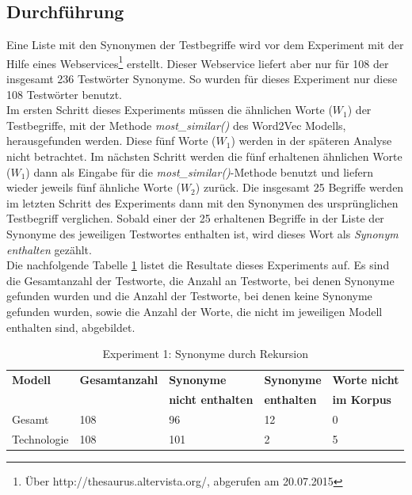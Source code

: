\documentclass[12pt,a4paper]{report}
\begin{document}
		\subsection*{Durchführung}
		Eine Liste mit den Synonymen der Testbegriffe wird vor dem Experiment mit der Hilfe eines Webservices\footnote{Über http://thesaurus.altervista.org/, abgerufen am 20.07.2015} erstellt. Dieser Webservice liefert aber nur für 108 der insgesamt 236 Testwörter Synonyme. So wurden für dieses Experiment nur diese 108 Testwörter benutzt.\\
		Im ersten Schritt dieses Experiments müssen die ähnlichen Worte ($W_1$) der Testbegriffe, mit der Methode \textit{most\_similar()} des Word2Vec Modells, herausgefunden werden. Diese fünf Worte ($W_1$) werden in der späteren Analyse nicht betrachtet. Im nächsten Schritt werden die fünf erhaltenen ähnlichen Worte ($W_1$) dann als Eingabe für die \textit{most\_similar()}-Methode benutzt und liefern wieder jeweils fünf ähnliche Worte ($W_2$) zurück. Die insgesamt 25 Begriffe werden im letzten Schritt des Experiments dann mit den Synonymen des ursprünglichen Testbegriff verglichen. Sobald einer der 25 erhaltenen Begriffe in der Liste der Synonyme des jeweiligen Testwortes enthalten ist, wird dieses Wort als \textit{Synonym enthalten} gezählt.\\
		Die nachfolgende Tabelle \ref{tab:experiment1} listet die Resultate dieses Experiments auf. Es sind die Gesamtanzahl der Testworte, die Anzahl an Testworte, bei denen Synonyme gefunden wurden und die Anzahl der Testworte, bei denen keine Synonyme gefunden wurden, sowie die Anzahl der Worte, die nicht im jeweiligen Modell enthalten sind, abgebildet.
		
		

		
		
\begin{table}[H]
\caption{Experiment 1: Synonyme durch Rekursion}
\label{tab:experiment1}
\begin{center}
\begin{tabular}{|l||l|l|l|l|}
\hline
\textbf{Modell} & \textbf{Gesamtanzahl}	&\textbf{Synonyme} & \textbf{Synonyme}  & \textbf{Worte nicht}  \\
 &			& \textbf{nicht enthalten} & \textbf{enthalten} & \textbf{im Korpus}  \\

\hline
 Gesamt & 108 & 96 & 12 & 0 \\
 \hline
 Technologie & 108 & 101 & 2 & 5 \\
 \hline
 
\end{tabular}
\end{center}
\end{table}
		
\end{document}
